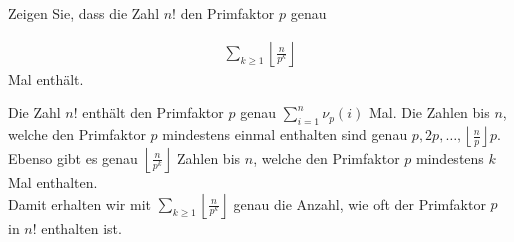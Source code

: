 
\begin{exercise}[Legendre]

Zeigen Sie, dass die Zahl $n!$ den Primfaktor $p$ genau

\begin{align*}
  \sum_{k \geq 1} \left\lfloor \frac{n}{p^k}\right\rfloor
\end{align*}
Mal enthält.
\end{exercise}


\begin{solution}

Die Zahl $n!$ enthält den Primfaktor $p$ genau $\sum_{i=1}^n \nu_p(i)$ Mal.
Die Zahlen bis $n$, welche den Primfaktor $p$ mindestens einmal enthalten sind genau
$p,2p,\dots,\left\lfloor \frac{n}{p}\right\rfloor p$.
Ebenso gibt es genau $\left\lfloor \frac{n}{p^k}\right\rfloor$ Zahlen bis $n$,
welche den Primfaktor $p$ mindestens $k$ Mal enthalten. \\
Damit erhalten wir mit $\sum_{k \geq 1} \left\lfloor \frac{n}{p^k}\right\rfloor$
genau die Anzahl, wie oft der Primfaktor $p$ in $n!$ enthalten ist.

\end{solution}

